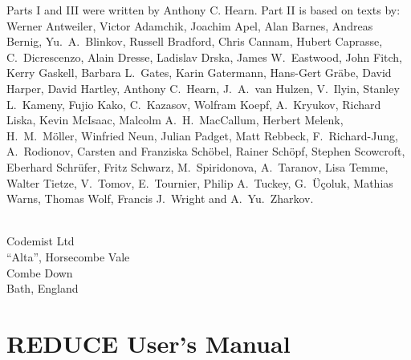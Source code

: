 \documentclass[11pt,letterpaper]{book}
\newcommand{\REDUCE}{REDUCE}
\begin{document}
Parts I and III were written by Anthony C. Hearn.  Part II is based on
texts by:\\
Werner Antweiler,
Victor Adamchik,
Joachim Apel,
Alan Barnes,
Andreas Bernig,
Yu.~A.~Blinkov,
Russell Bradford,
Chris Cannam,
Hubert Caprasse,
C.~{Dicrescenzo},
Alain Dresse,
Ladislav Drska,
James W.~Eastwood,
John Fitch,
Kerry Gaskell,
Barbara L.~Gates,
Karin Gatermann,
Hans-Gert Gr\"abe,
David Harper,
David {H}artley,
Anthony C.~Hearn,
J.~A.~van Hulzen,
V.~Ilyin,
Stanley L.~Kameny,
Fujio Kako,
C.~Kazasov,
Wolfram Koepf,
A.~Kryukov,
Richard Liska,
Kevin McIsaac,
Malcolm A.~H.~MacCallum,
Herbert Melenk,
H.~M.~M\"oller,
Winfried Neun,
Julian Padget,
Matt Rebbeck,
F.~Richard-Jung,
A.~Rodionov,
Carsten and Franziska Sch\"obel,
{Rainer} Sch\"opf,
Stephen Scowcroft,
Eberhard Schr\"{u}fer,
Fritz Schwarz,
M.~Spiridonova,
A.~Taranov,
Lisa Temme,
Walter Tietze,
V.~Tomov,
E.~Tournier,
Philip A.~Tuckey,
G.~\"{U}\c{c}oluk,
Mathias Warns,
Thomas Wolf,
Francis J.~Wright
and
A.~Yu.~Zharkov.

\noindent
{} \\
Codemist Ltd \\
``Alta'', Horsecombe Vale \\
Combe Down \\
Bath, England
\newpage
\tableofcontents
\part{{\REDUCE} User's Manual}
\end{document}
